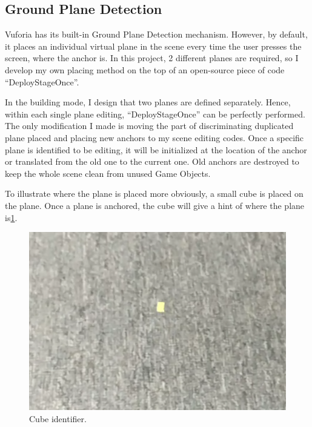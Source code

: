 \documentclass[11pt]{article}
\begin{document}
	\subsection{Ground Plane Detection}
	Vuforia has its built-in Ground Plane Detection\cite{vuforiagpd} mechanism. However, by default, it places an individual virtual plane in the scene every time the user presses the screen, where the anchor is. In this project, 2 different planes are required, so I develop my own placing method on the top of an open-source piece of code ``DeployStageOnce''.
	
	In the building mode, I design that two planes are defined separately. Hence, within each single plane editing, ``DeployStageOnce'' can be perfectly performed. The only modification I made is moving the part of discriminating duplicated plane placed and placing new anchors to my scene editing codes. Once a specific plane is identified to be editing, it will be initialized at the location of the anchor or translated from the old one to the current one. Old anchors are destroyed to keep the whole scene clean from unused Game Objects.
	
	To illustrate where the plane is placed more obviously, a small cube is placed on the plane. Once a plane is anchored, the cube will give a hint of where the plane is\ref{fig:cube}.
	\begin{figure}[htbp]
		\centering
		\includegraphics[width=.80\textwidth]{fig/cube.png}
		\caption{Cube identifier.}
		\label{fig:cube}
	\end{figure}
\end{document}
